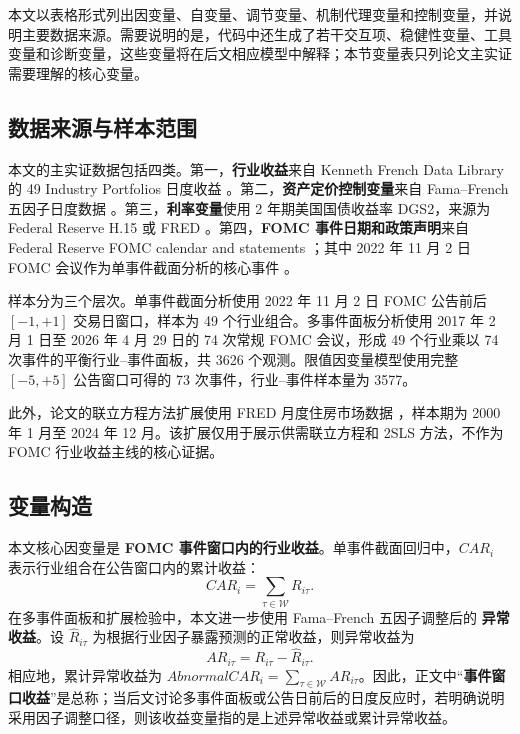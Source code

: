\documentclass[UTF8,zihao=-4]{ctexart}
\begin{document}
本文以表格形式列出因变量、自变量、调节变量、机制代理变量和控制变量，并说明主要数据来源。需要说明的是，代码中还生成了若干交互项、稳健性变量、工具变量和诊断变量，这些变量将在后文相应模型中解释；本节变量表只列论文主实证需要理解的核心变量。

\subsection{数据来源与样本范围}

本文的主实证数据包括四类。第一，\textbf{行业收益}来自 Kenneth French Data Library 的 49 Industry Portfolios 日度收益 \cite{kenFrench49Daily}。第二，\textbf{资产定价控制变量}来自 Fama--French 五因子日度数据 \cite{kenFrenchFF5Daily}。第三，\textbf{利率变量}使用 2 年期美国国债收益率 DGS2，来源为 Federal Reserve H.15 或 FRED \cite{federalReserveH15,fredDGS2}。第四，\textbf{FOMC 事件日期和政策声明}来自 Federal Reserve FOMC calendar and statements \cite{federalReserveFOMCCalendar}；其中 2022 年 11 月 2 日 FOMC 会议作为单事件截面分析的核心事件 \cite{federalReserveFOMC20221102}。

样本分为三个层次。单事件截面分析使用 2022 年 11 月 2 日 FOMC 公告前后 $[-1,+1]$ 交易日窗口，样本为 49 个行业组合。多事件面板分析使用 2017 年 2 月 1 日至 2026 年 4 月 29 日的 74 次常规 FOMC 会议，形成 49 个行业乘以 74 次事件的平衡行业--事件面板，共 3626 个观测。限值因变量模型使用完整 $[-5,+5]$ 公告窗口可得的 73 次事件，行业--事件样本量为 3577。

此外，论文的联立方程方法扩展使用 FRED 月度住房市场数据 \cite{fredHousingSeries}，样本期为 2000 年 1 月至 2024 年 12 月。该扩展仅用于展示供需联立方程和 2SLS 方法，不作为 FOMC 行业收益主线的核心证据。

\subsection{变量构造}

本文核心因变量是 \textbf{FOMC 事件窗口内的行业收益}。单事件截面回归中，$CAR_i$ 表示行业组合在公告窗口内的累计收益：
\[
CAR_i=\sum_{\tau\in\mathcal{W}}R_{i\tau}.
\]
在多事件面板和扩展检验中，本文进一步使用 Fama--French 五因子调整后的 \textbf{异常收益}。设 $\widehat{R}_{i\tau}$ 为根据行业因子暴露预测的正常收益，则异常收益为
\[
AR_{i\tau}=R_{i\tau}-\widehat{R}_{i\tau}.
\]
相应地，累计异常收益为 $AbnormalCAR_i=\sum_{\tau\in\mathcal{W}}AR_{i\tau}$。因此，正文中“\textbf{事件窗口收益}”是总称；当后文讨论多事件面板或公告日前后的日度反应时，若明确说明采用因子调整口径，则该收益变量指的是上述异常收益或累计异常收益。
\end{document}
